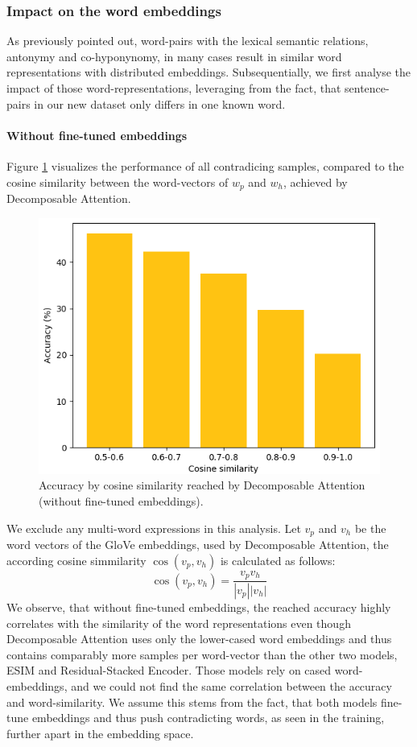\subsubsection{Impact on the word embeddings}
As previously pointed out, word-pairs with the lexical semantic relations, antonymy and co-hyponynomy, in many cases result in similar word representations with distributed embeddings. Subsequentially, we first analyse the impact of those word-representations, leveraging from the fact, that sentence-pairs in our new dataset only differs in one known word.
\paragraph*{Without fine-tuned embeddings}
Figure \ref{fig:decomp_acc_per_cos_sim} visualizes the performance of all contradicing samples, compared to the cosine similarity between the word-vectors of $w_p$ and $w_h$, achieved by Decomposable Attention. 
\begin{figure}[tph!]
\centering
	\includegraphics[totalheight=5cm]{fig/acc_by_cos.png}
	\caption{Accuracy by cosine similarity reached by Decomposable Attention (without fine-tuned embeddings).}
	\label{fig:decomp_acc_per_cos_sim}
\end{figure}
We exclude any multi-word expressions in this analysis. Let $v_p$ and $v_h$ be the word vectors of the GloVe embeddings, used by Decomposable Attention, the according cosine simmilarity $\cos(v_p,v_h)$ is calculated as follows:
\begin{equation}
\cos(v_p,v_h) = \frac{v_p v_h}{|v_p| |v_h|}
\end{equation}
We observe, that without fine-tuned embeddings, the reached accuracy highly correlates with the similarity of the word representations even though Decomposable Attention uses only the lower-cased word embeddings and thus contains comparably more samples per word-vector than the other two models, ESIM and Residual-Stacked Encoder. Those models rely on cased word-embeddings, and we could not find the same correlation between the accuracy and word-similarity. We assume this stems from the fact, that both models fine-tune embeddings and thus push contradicting words, as seen in the training, further apart in the embedding space. 
